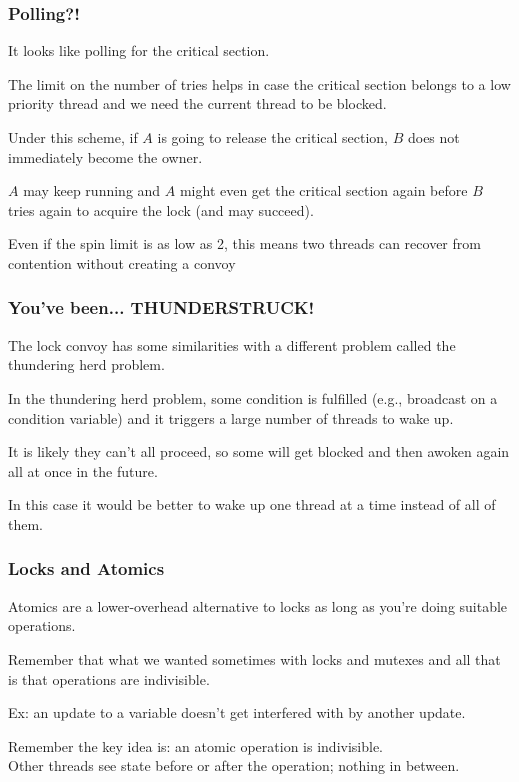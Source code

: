 \begin{frame}
\frametitle{Polling?!}

It looks like polling for the critical section. 

The limit on the number of tries helps in case the critical section belongs to a low priority thread and we need the current thread to be blocked.

Under this scheme, if $A$ is going to release the critical section, $B$ does not immediately become the owner. 

$A$ may keep running and $A$ might even get the critical section again before $B$ tries again to acquire the lock (and may succeed). 

Even if the spin limit is as low as 2, this means two threads can recover from contention without creating a convoy

\end{frame}


\begin{frame}
\frametitle{You've been... THUNDERSTRUCK!}

The lock convoy has some similarities with a different problem called the \alert{thundering herd problem}. 

In the thundering herd problem, some condition is fulfilled (e.g., broadcast on a condition variable) and it triggers a large number of threads to wake up. 

It is likely they can't all proceed, so some will get blocked and then awoken again all at once in the future. 

In this case it would be better to wake up one thread at a time instead of all of them.

\end{frame}



\begin{frame}
\frametitle{Locks and Atomics}

 Atomics are a lower-overhead alternative to
locks as long as you're doing suitable operations. 

Remember that what we wanted sometimes with locks and mutexes and all that is that operations are indivisible.

Ex: an update to a variable doesn't get interfered with by another update. 

Remember the key idea is: an \alert{atomic operation} is indivisible.\\
\quad Other threads see state before or after the operation; nothing in between.

\end{frame}


